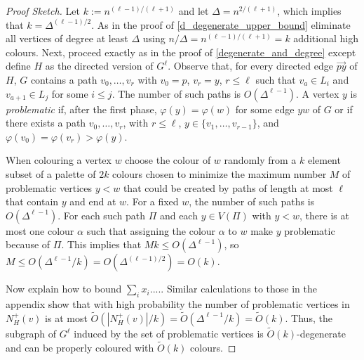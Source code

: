 \documentclass{patmorin}
\newcommand{\defin}[1]{\emph{\color{brightmaroon}#1}}
\begin{document}
\begin{proof}[Proof Sketch]
  Let $k:=n^{(\ell-1)/(\ell+1)}$ and let $\Delta=n^{2/(\ell+1)}$, which implies that $k=\Delta^{(\ell-1)/2}$.  As in the proof of \cref{d_degenerate_upper_bound} eliminate all vertices of degree at least $\Delta$ using $n/\Delta = n^{(\ell-1)/(\ell+1)}=k$ additional high colours.  Next, proceed exactly as in the proof of \cref{degenerate_and_degree} except define $H$ as the directed version of $G^{\ell}$.  Observe that, for every directed edge $\overrightarrow{py}$ of $H$, $G$ contains a path $v_0,\ldots,v_r$ with $v_0=p$, $v_r=y$, $r\le \ell$ such that $v_a\in L_i$ and $v_{a+1}\in L_j$ for some $i\le j$.  The number of such paths is $O(\Delta^{\ell-1})$. A vertex $y$ is \defin{problematic} if, after the first phase, $\varphi(y)=\varphi(w)$ for some edge $yw$ of $G$ or if there exists a path $v_0,\ldots,v_r$, with $r\le \ell$, $y\in\{v_1,\ldots,v_{r-1}\}$, and $\varphi(v_0)=\varphi(v_r) > \varphi(y)$.

  When colouring a vertex $w$ choose the colour of $w$ randomly from a $k$ element subset of a palette of $2k$ colours chosen to minimize the maximum number $M$ of problematic vertices $y<w$ that could be created by paths of length at most $\ell$ that contain $y$ and end at $w$.  For a fixed $w$, the number of such paths is $O(\Delta^{\ell-1})$. For each such path $\Pi$ and each $y\in V(\Pi)$ with $y < w$, there is at most one colour $\alpha$ such that assigning the colour $\alpha$ to $w$ make $y$ problematic because of $\Pi$.  This implies that $Mk \le O(\Delta^{\ell-1})$, so $M\le O(\Delta^{\ell-1}/k)=O(\Delta^{(\ell-1)/2})=O(k)$.

  Now explain how to bound $\sum_i x_i$.....
  Similar calculations to those in the appendix show that with high probability the number of problematic vertices in $N^+_{H}(v)$ is at most $\tilde{O}(|N^+_{H}(v)|/k)=\tilde{O}(\Delta^{\ell-1}/k)=\tilde{O}(k)$.  Thus, the subgraph of $G^\ell$ induced by the set of problematic vertices is $\tilde{O}(k)$-degenerate and can be properly coloured with $\tilde{O}(k)$ colours.
\end{proof}


\end{document}
